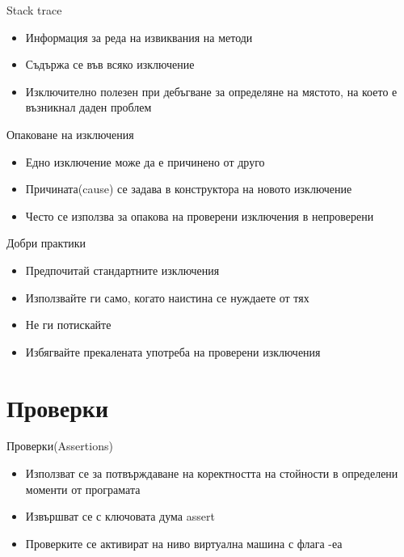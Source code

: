 \documentclass{beamer}
\begin{document}
\begin{frame}{Stack trace}
  \transdissolve
  \begin{itemize}
  \item Информация за реда на извиквания на методи
  \item Съдържа се във всяко изключение
  \item Изключително полезен при дебъгване за определяне на мястото,
    на което е възникнал даден проблем
  \end{itemize}
\end{frame}

\begin{frame}{Опаковане на изключения}
  \transdissolve
  \begin{itemize}
  \item Едно изключение може да е причинено от друго
  \item Причината(cause) се задава в конструктора на новото изключение
  \item Често се използва за опакова на проверени изключения в непроверени
  \end{itemize}
\end{frame}

\begin{frame}{Добри практики}
  \transdissolve
  \begin{itemize}
  \item Предпочитай стандартните изключения
  \item Използвайте ги само, когато наистина се нуждаете от тях
  \item Не ги потискайте
  \item Избягвайте прекалената употреба на проверени изключения
  \end{itemize}
\end{frame}

\section{Проверки}

\begin{frame}{Проверки(Assertions)}
  \transdissolve
  \begin{itemize}
  \item Използват се за потвърждаване на коректността на стойности в
    определени моменти от програмата
  \item Извършват се с ключовата дума assert
  \item Проверките се активират на ниво виртуална машина с флага -еа
  \end{itemize}
\end{frame}
\end{document}
